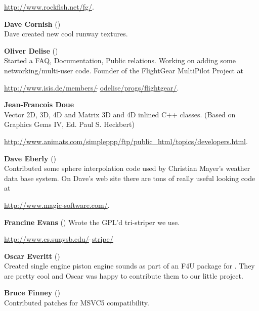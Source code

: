  \href{http://www.rockfish.net/fg/}{http://www.rockfish.net/fg/}.
 \medskip

\noindent \textbf{Dave Cornish} ()\\
 Dave created new cool runway textures.
 \medskip

\noindent \textbf{Oliver Delise}  ()\\
 Started a FAQ, Documentation, Public relations. Working on adding some
  networking/multi-user code. Founder of the FlightGear MultiPilot
  Project at
   \medskip

  \href{http://www.isis.de/members/~odelise/progs/flightgear/}{http://www.isis.de/members/$\tilde{~~}$odelise/progs/flightgear/}.
\medskip

\noindent \textbf{Jean-Francois Doue}\\
  Vector 2D, 3D, 4D and Matrix 3D and 4D inlined C++ classes.  (Based on
  Graphics Gems IV, Ed. Paul S. Heckbert)
  \medskip

\href{http://www.animats.com/simpleppp/ftp/public_html/topics/developers.html}{http://www.animats.com/simpleppp/ftp/public\_html/topics/developers.html}.
 \medskip

\noindent \textbf{Dave Eberly}  ()\\
  Contributed some sphere interpolation code used by Christian Mayer's
  weather data base system.  On Dave's web site there are tons of
  really useful looking code at
  \medskip

\href{http://www.magic-software.com/}{http://www.magic-software.com/}.
  \medskip

\noindent \textbf{Francine Evans} ()
  Wrote the GPL'd tri-striper we use.
  \medskip

\href{http://www.cs.sunysb.edu/~stripe/}{http://www.cs.sunysb.edu/$\tilde{~~}$stripe/}
\medskip

\noindent \textbf{Oscar Everitt} ()\\
  Created single engine piston engine sounds as part of an F4U package
  for .  They are pretty cool and Oscar was happy to contribute
  them to our little project.
 \medskip

\noindent \textbf{Bruce Finney} ()\\
  Contributed patches for MSVC5 compatibility.
 \medskip

